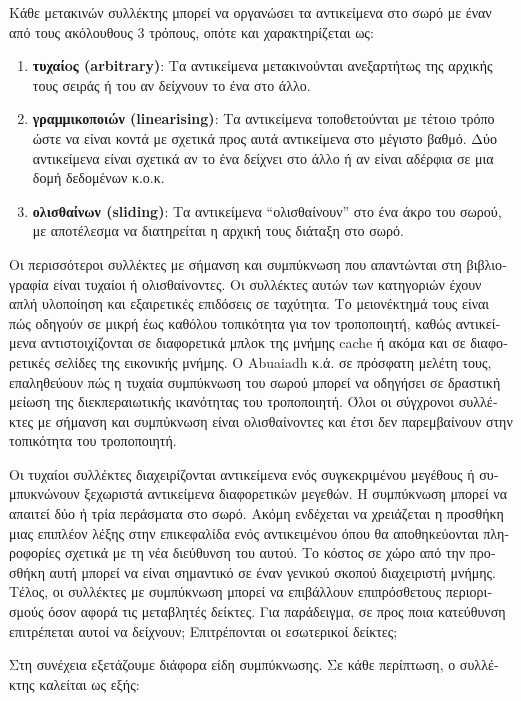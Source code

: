 \begin{greek}
Κάθε μετακινών συλλέκτης μπορεί να οργανώσει τα αντικείμενα στο σωρό με έναν από τους 
ακόλουθους 3 τρόπους, οπότε και χαρακτηρίζεται ως:
\begin{enumerate}
\item \textbf{τυχαίoς (arbitrary)}: Τα αντικείμενα μετακινούνται ανεξαρτήτως της αρχικής 
      τους σειράς ή του αν δείχνουν το ένα στο άλλο. 
\item \textbf{γραμμικοποιών (linearising)}: Τα αντικείμενα τοποθετούνται με τέτοιο 
      τρόπο ώστε να είναι κοντά με σχετικά προς αυτά αντικείμενα στο μέγιστο βαθμό. Δύο 
      αντικείμενα είναι σχετικά αν το ένα δείχνει στο άλλο ή αν είναι αδέρφια σε μια 
      δομή δεδομένων κ.ο.κ.
\item \textbf{ολισθαίνων (sliding)}: Τα αντικείμενα ``ολισθαίνουν'' στο ένα άκρο του 
      σωρού, με αποτέλεσμα να διατηρείται η αρχική τους διάταξη στο σωρό. 
\end{enumerate}

Οι περισσότεροι συλλέκτες με σήμανση και συμπύκνωση που απαντώνται στη βιβλιογραφία είναι 
τυχαίοι ή ολισθαίνοντες. Οι συλλέκτες αυτών των κατηγοριών έχουν απλή υλοποίηση και 
εξαιρετικές επιδόσεις σε ταχύτητα. Το μειονέκτημά τους είναι πώς οδηγούν σε μικρή έως 
καθόλου τοπικότητα για τον τροποποιητή, καθώς αντικείμενα αντιστοιχίζονται σε διαφορετικά 
μπλοκ της μνήμης cache ή ακόμα και σε διαφορετικές σελίδες της εικονικής μνήμης. Ο 
Abuaiadh κ.ά. σε πρόσφατη μελέτη τους, \cite{DBLP:conf/oopsla/AbuaiadhOPS04} επαληθεύουν 
πώς η τυχαία συμπύκνωση του σωρού μπορεί να οδηγήσει σε δραστική μείωση της διεκπεραιωτικής 
ικανότητας του τροποποιητή. Όλοι οι σύγχρονοι συλλέκτες με σήμανση και συμπύκνωση είναι 
ολισθαίνοντες και έτσι δεν παρεμβαίνουν στην τοπικότητα του τροποποιητή.

Οι τυχαίοι συλλέκτες διαχειρίζονται αντικείμενα ενός συγκεκριμένου μεγέθους ή συμπυκνώνουν 
ξεχωριστά αντικείμενα διαφορετικών μεγεθών. Η συμπύκνωση μπορεί να απαιτεί δύο ή τρία 
περάσματα στο σωρό. Ακόμη ενδέχεται να χρειάζεται η προσθήκη μιας επιπλέον λέξης στην 
επικεφαλίδα ενός αντικειμένου όπου θα αποθηκεύονται πληροφορίες σχετικά με τη νέα διεύθυνση 
του αυτού. Το κόστος σε χώρο από την προσθήκη αυτή μπορεί να είναι σημαντικό σε έναν γενικού 
σκοπού διαχειριστή μνήμης. Τέλος, οι συλλέκτες με συμπύκνωση μπορεί να επιβάλλουν 
επιπρόσθετους περιορισμούς όσον αφορά τις μεταβλητές δείκτες. Για παράδειγμα, σε προς ποια 
κατεύθυνση επιτρέπεται αυτοί να δείχνουν; Επιτρέπονται οι εσωτερικοί δείκτες;

Στη συνέχεια εξετάζουμε διάφορα είδη συμπύκνωσης. Σε κάθε περίπτωση, ο συλλέκτης καλείται 
ως εξής:


\end{greek}
